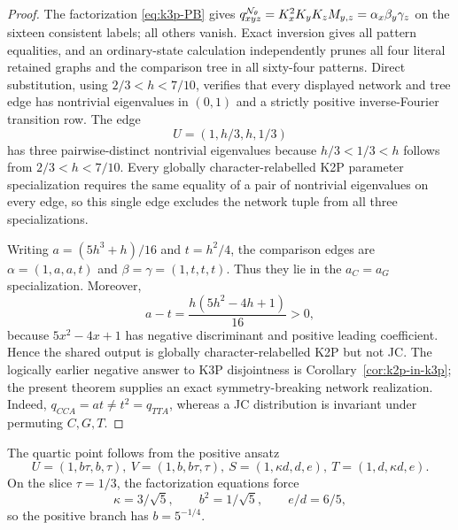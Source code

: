 \documentclass[11pt]{article}
\theoremstyle{remark}\newtheorem{remark}[theorem]{Remark}
\begin{document}
\begin{proof}
The factorization \eqref{eq:k3p-PB} gives $q^{\mathcal N_\theta}_{xyz}=K_x^2K_yK_zM_{y,z}=\alpha_x\beta_y\gamma_z$ on the sixteen consistent labels; all others vanish. Exact inversion gives all pattern equalities, and an ordinary-state calculation independently prunes all four literal retained graphs and the comparison tree in all sixty-four patterns. Direct substitution, using $2/3<h<7/10$, verifies that every displayed network and tree edge has nontrivial eigenvalues in $(0,1)$ and a strictly positive inverse-Fourier transition row. The edge
\[
U=(1,h/3,h,1/3)
\]
has three pairwise-distinct nontrivial eigenvalues because $h/3<1/3<h$ follows from $2/3<h<7/10$. Every globally character-relabelled K2P parameter specialization requires the same equality of a pair of nontrivial eigenvalues on every edge, so this single edge excludes the network tuple from all three specializations.

Writing $a=(5h^3+h)/16$ and $t=h^2/4$, the comparison edges are $\alpha=(1,a,a,t)$ and $\beta=\gamma=(1,t,t,t)$. Thus they lie in the $a_C=a_G$ specialization. Moreover,
\[
a-t=\frac{h(5h^2-4h+1)}{16}>0,
\]
because $5x^2-4x+1$ has negative discriminant and positive leading coefficient. Hence the shared output is globally character-relabelled K2P but not JC. The logically earlier negative answer to K3P disjointness is Corollary~\ref{cor:k2p-in-k3p}; the present theorem supplies an exact symmetry-breaking network realization.
Indeed, $q_{CCA}=at\ne t^2=q_{TTA}$, whereas a JC distribution is invariant under permuting $C,G,T$.
\end{proof}
The quartic point follows from the positive ansatz
\[
U=(1,b\tau,b,\tau),\ V=(1,b,b\tau,\tau),\ S=(1,\kappa d,d,e),\ T=(1,d,\kappa d,e).
\]
On the slice $\tau=1/3$, the factorization equations force
\[
\kappa=3/\sqrt5,\qquad b^2=1/\sqrt5,\qquad e/d=6/5,
\]
so the positive branch has $b=5^{-1/4}$.
\end{document}
